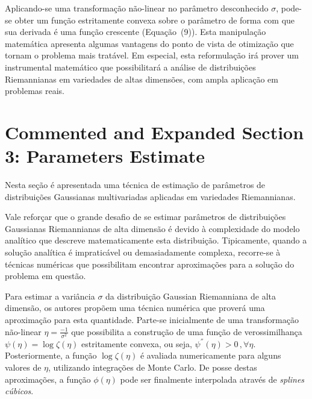 \documentclass[a4paper,titlepage]{article}
\begin{document}
Aplicando-se uma transformação não-linear no parâmetro desconhecido $\sigma$,
pode-se obter um função estritamente convexa sobre o parâmetro de forma com que
sua derivada é uma função crescente (Equação~(9)). Esta manipulação matemática
apresenta algumas vantagens do ponto de vista de otimização que tornam o
problema mais tratável. Em especial, esta reformulação irá prover um
instrumental matemático que possibilitará a análise de distribuições
Riemannianas em variedades de altas dimensões, com ampla aplicação em problemas
reais.

\section{Commented and Expanded Section 3: Parameters Estimate}
Nesta seção é apresentada uma técnica de estimação de parâmetros de
distribuições Gaussianas multivariadas aplicadas em variedades Riemannianas.

\begin{center}
  \vspace{1em}
  \vspace{1em}
\end{center}

Vale reforçar que o grande desafio de se estimar parâmetros de distribuições
Gaussianas Riemannianas de alta dimensão é devido à complexidade do modelo
analítico que descreve matematicamente esta distribuição. Tipicamente, quando
a solução analítica é impraticável ou demasiadamente complexa, recorre-se à
técnicas numéricas que possibilitam encontrar aproximações para a solução do
problema em questão.

Para estimar a variância $\sigma$ da distribuição Gaussian Riemanniana de alta
dimensão, os autores propõem uma técnica numérica que proverá uma aproximação
para esta quantidade. Parte-se inicialmente de uma transformação não-linear
$\eta = \frac{-1}{\sigma^2}$ que possibilita a construção de uma função de
verossimilhança $\psi(\eta) = \log \zeta(\eta)$ estritamente convexa, ou seja,
$\psi^{''}(\eta) > 0\,, \forall \eta$. Posteriormente, a função
$\log \zeta(\eta)$ é avaliada numericamente para alguns valores de $\eta$,
utilizando integrações de Monte Carlo. De posse destas aproximações, a função
$\phi(\eta)$ pode ser finalmente interpolada através de \textit{splines cúbicos}. 
\end{document}
